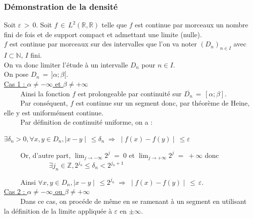 \documentclass[10pt]{beamer}
\begin{document}
    
    \begin{frame}[allowframebreaks]
      \frametitle{D\'{e}monstration de la densit\'{e}}
	  Soit $\varepsilon \, > \, 0$. Soit $f \, \in \, L^2(\mathbb{R},\mathbb{R})$ telle que $f$ est continue par morceaux un nombre fini de fois
	  et de support compact et admettant une limite (nulle).\\
	  $f$ est continue par morceaux sur des intervalles que l'on va noter $(D_n)_{n \in I}$ avec $I \subset \mathbb{N} $, $I$ fini. \\
	  On va donc limiter l'\'{e}tude \`{a} un intervalle $D_n$ pour $n \in I$. \\
	  On pose $D_n \, = \, ]\alpha; \beta[$. \\
	      
	  \underline{Cas 1 : $\alpha \neq - \infty$ et $\beta \neq + \infty$} \\
	  $\phantom{Prop}$ Ainsi la fonction $f$ est prolongeable par continuit\'{e} sur $\overline{D_n} \, = \, [\alpha; \beta]$. \\
	  $\phantom{Prop}$ Par cons\'{e}quent, $f$ est continue sur un segment donc, par th\'{e}or\`{e}me de Heine, elle y est uniform\'{e}ment continue. \\
	  $\phantom{Prop}$ Par d\'{e}finition de continuit\'{e} uniforme, on a :
	  \begin{center}
	    $\exists \delta_n > 0, \forall x, y \in D_n, \mid x - y \mid \, \leqslant \delta_n \; \Rightarrow \; \mid f(x) - f(y) \mid \, \leqslant \varepsilon$
	  \end{center}

	  $\phantom{Prop}$ Or, d'autre part, $\displaystyle \lim_{j \rightarrow - \infty} 2^j \; = \; 0$ et 
		$\displaystyle \lim_{j \rightarrow + \infty} 2^j \; = \; + \infty$ donc \\ 
	  $\phantom{PropPropProp}$ $ \exists j_n \in \mathbb{Z}, 2^{j_n} \leqslant \delta_n < 2^{j_n + 1} $
	  
	  $\phantom{Prop}$ Ainsi $\forall x, y \in D_n, \mid x - y \mid \, \leqslant 2^{j_n} \; \Rightarrow \; \mid f(x) - f(y) \mid \, \leqslant \, \varepsilon $. \\
	  
	  \underline{Cas 2 : $\alpha \neq - \infty$ ou $\beta \neq + \infty$} \\
	  $\phantom{Prop}$ Dans ce cas, on proc\'{e}de de m\^{e}me en se ramenant \`{a} un segment en utilisant la d\'{e}finition de la 
	      limite appliqu\'{e}e \`{a} $\varepsilon$ en $\pm \infty$. \\
	  

\end{frame}
\end{document}

